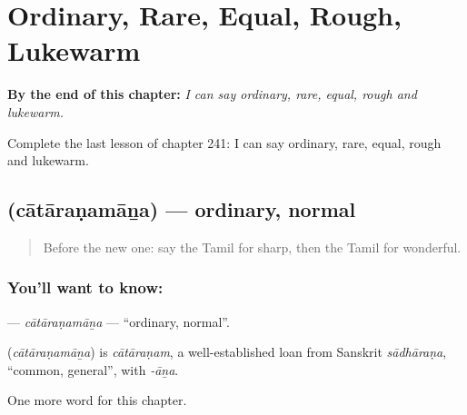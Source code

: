 
\chapter{Ordinary, Rare, Equal, Rough, Lukewarm}
\label{ch:ta-ordinary-rare-equal-rough-lukewarm}

\begin{chapteropening}
\textbf{By the end of this chapter:} \emph{I can say ordinary, rare, equal, rough and lukewarm.}

Complete the last lesson of chapter 241: I can say ordinary, rare, equal, rough and lukewarm.
\end{chapteropening}

\section[\texorpdfstring{\ta{சாதாரணமான} (cātāraṇamāṉa)}{சாதாரணமான (cātāraṇamāṉa)}]{ (cātāraṇamāṉa) — ordinary, normal}

\label{lesson:TA-C241-cataranamana}



\begin{quote}
Before the new one: say the Tamil for sharp, then the Tamil for wonderful.
\end{quote}

\subsection*{You'll want to know: }
\textbf{} — \emph{cātāraṇamāṉa} — \textquotedblleft{}ordinary, normal\textquotedblright{}.

\begin{cousinweb}
\textbf{} (\emph{cātāraṇamāṉa}) is \emph{cātāraṇam}, a well-established loan from Sanskrit \emph{sādhāraṇa}, \textquotedblleft{}common, general\textquotedblright{}, with \emph{-āṉa}.
\end{cousinweb}

\begin{grammarlens}[title={What you've built}]
One more word for this chapter.
\end{grammarlens}

